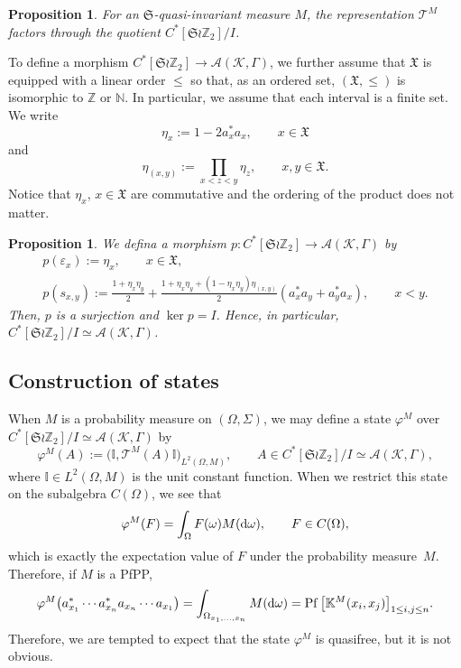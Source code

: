 \documentclass[pdftex]{sigma}
\numberwithin{equation}{section}
\newtheorem{Proposition}[Theorem]{Proposition}
 { \theoremstyle{definition}
\newtheorem{Definition}[Theorem]{Definition}
\newtheorem{Example}[Theorem]{Example}
\newtheorem{Remark}[Theorem]{Remark} }
\newcommand{\pf}{\operatorname{Pf}}
\newcommand{\mfrak}[1]{\mathfrak{#1}}
\newcommand{\mcal}[1]{\mathcal{#1}}
\newcommand{\mbb}[1]{\mathbb{#1}}
\begin{document}
\begin{Proposition}
For an $\mfrak{S}$-quasi-invariant measure $M$, the representation $\mcal{T}^{M}$ factors through the quotient $C^{\ast}[\mfrak{S}\wr\mbb{Z}_{2}]/I$.
\end{Proposition}

To define a morphism $C^{\ast}[\mfrak{S}\wr\mbb{Z}_{2}]\to\mcal{A}(\mcal{K},\Gamma)$, we further assume that $\mfrak{X}$ is equipped with a linear order $\le$ so that, as an ordered set, $(\mfrak{X},\le)$ is isomorphic to $\mbb{Z}$ or $\mbb{N}$. In particular, we assume that each interval is a finite set.
We write
\begin{equation*}
	\eta_{x}:=1-2a^{\ast}_{x}a_{x},\qquad x\in\mfrak{X}
\end{equation*}
and
\begin{equation*}
	\eta_{(x,y)}:=\prod_{x<z<y}\eta_{z},\qquad x,y\in\mfrak{X}.
\end{equation*}
Notice that $\eta_{x}$, $x\in\mfrak{X}$ are commutative and the ordering of the product does not matter.
\begin{Proposition}
We defina a morphism $p\colon C^{\ast}[\mfrak{S}\wr\mbb{Z}_{2}]\to\mcal{A}(\mcal{K},\Gamma)$ by
\begin{gather*}
	p(\varepsilon_{x}):=\eta_{x},\qquad x\in\mfrak{X}, \\
p(s_{x,y}) :=\frac{1+\eta_{x}\eta_{y}}{2}+\frac{1+\eta_{x}\eta_{y}+(1-\eta_{x}\eta_{y})\eta_{(x,y)}}{2}(a^{\ast}_{x}a_{y}+a^{\ast}_{y}a_{x}),\qquad x<y.
\end{gather*}
Then, $p$ is a surjection and $\ker p=I$. Hence, in particular, $C^{\ast}[\mfrak{S}\wr\mbb{Z}_{2}]/I\simeq \mcal{A}(\mcal{K},\Gamma)$.
\end{Proposition}

\subsection{Construction of states}
When $M$ is a probability measure on $(\Omega,\Sigma)$, we may define a state $\varphi^{M}$ over $C^{\ast}[\mfrak{S}\wr\mbb{Z}_{2}]/I\simeq \mcal{A}(\mcal{K},\Gamma)$ by
\begin{equation*}
	\varphi^{M}(A):=\big(\mbb{I},\mcal{T}^{M}(A)\mbb{I}\big)_{L^{2}(\Omega, M)},\qquad A\in C^{\ast}[\mfrak{S}\wr\mbb{Z}_{2}]/I\simeq \mcal{A}(\mcal{K},\Gamma),
\end{equation*}
where $\mbb{I}\in L^{2}(\Omega, M)$ is the unit constant function.
When we restrict this state on the subalgebra $C(\Omega)$, we see that
\begin{equation*}
	\varphi^{M}(F)=\int_{\Omega}F(\omega)M({\rm d}\omega),\qquad F\in C(\Omega),
\end{equation*}
which is exactly the expectation value of $F$ under the probability measure~$M$.
Therefore, if $M$ is a PfPP,
\begin{equation*}
	\varphi^{M}\big(a_{x_{1}}^{\ast}\cdots a_{x_{n}}^{\ast}a_{x_{n}}\cdots a_{x_{1}}\big)=\int_{\Omega_{x_{1},\dots, x_{n}}}M({\rm d}\omega)=\pf\big[\mbb{K}^{M}(x_{i},x_{j})\big]_{1\le i,j\le n}.
\end{equation*}
Therefore, we are tempted to expect that the state $\varphi^{M}$ is quasifree, but it is not obvious.
\end{document}
